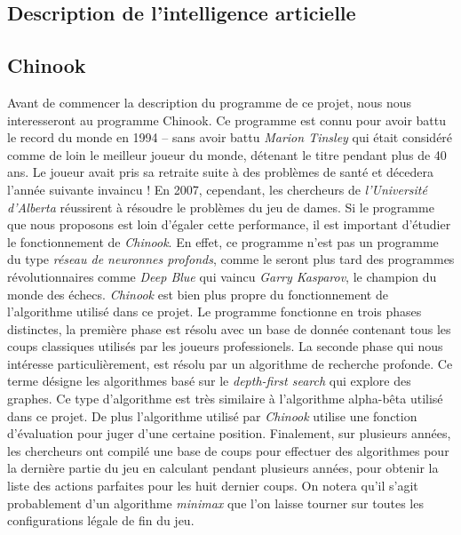 \documentclass[a4paper,11pt]{article}
\begin{document}
\begin{multicols}{2}[]
\section{Description de l'intelligence articielle}

  \subsection{Chinook}

    Avant de commencer la description du programme de ce projet, nous nous
    interesseront au programme Chinook. Ce programme est connu pour avoir battu
    le record du monde en 1994 -- sans avoir battu \emph{Marion Tinsley} qui
    était considéré comme de loin le meilleur joueur du monde, détenant le
    titre pendant plus de 40 ans. Le joueur avait pris sa retraite suite à des
    problèmes de santé et décedera l'année suivante invaincu ! En 2007,
    cependant, les chercheurs de \emph{l'Université d'Alberta} réussirent à
    résoudre le problèmes du jeu de dames. Si le programme que nous proposons
    est loin d'égaler cette performance, il est important d'étudier le
    fonctionnement de \emph{Chinook}.  En effet, ce programme n'est pas un
    programme du type \emph{réseau de neuronnes profonds}, comme le seront plus
    tard des programmes révolutionnaires comme \emph{Deep Blue} qui vaincu
    \emph{Garry Kasparov}, le champion du monde des échecs. \emph{Chinook} est
    bien plus propre du fonctionnement de l'algorithme utilisé dans ce projet.
    Le programme fonctionne en trois phases distinctes, la première phase est
    résolu avec un base de donnée contenant tous les coups classiques utilisés
    par les joueurs professionels. La seconde phase qui nous intéresse
    particulièrement, est résolu par un algorithme de recherche profonde. Ce
    terme désigne les algorithmes basé sur le \emph{depth-first search} qui
    explore des graphes. Ce type d'algorithme est très similaire à l'algorithme
    alpha-bêta utilisé dans ce projet. De plus l'algorithme utilisé par
    \emph{Chinook} utilise une fonction d'évaluation pour juger d'une certaine
    position. Finalement, sur plusieurs années, les chercheurs ont compilé une
    base de coups pour effectuer des algorithmes pour la dernière partie du jeu
    en calculant pendant plusieurs années, pour obtenir la liste des actions
    parfaites pour les huit dernier coups. On notera qu'il s'agit probablement
    d'un algorithme \emph{minimax} que l'on laisse tourner sur toutes les
    configurations légale de fin du jeu.


\end{multicols}
\end{document}
